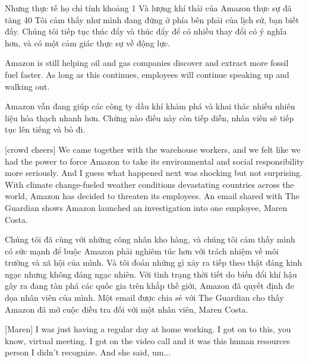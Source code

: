 \documentclass[a4paper]{article}
\begin{document}
	\begin{vietnamese-v2}
		Nhưng thực tế họ chỉ tính khoảng 1%
		Và lượng khí thải của Amazon thực sự đã tăng 40%
		Tôi cảm thấy như mình đang đứng ở phía bên phải của lịch sử, bạn biết đấy.
		Chúng tôi tiếp tục thúc đẩy và thúc đẩy để có nhiều thay đổi có ý nghĩa hơn, và có một cảm giác thực sự về động lực.
	\end{vietnamese-v2}
	
	Amazon is still helping oil and gas companies discover and extract more fossil fuel faster.
	As long as this continues, employees will continue speaking up and walking out.
	
	\begin{vietnamese-v2}
		Amazon vẫn đang giúp các công ty dầu khí khám phá và khai thác nhiều nhiên liệu hóa thạch nhanh hơn.
		Chừng nào điều này còn tiếp diễn, nhân viên sẽ tiếp tục lên tiếng và bỏ đi.
	\end{vietnamese-v2}
	
	[crowd cheers]
	We came together with the warehouse workers, and we felt like we had the power to force Amazon to take its environmental and social responsibility more seriously.
	And I guess what happened next was shocking but not surprising.
	With climate change-fueled weather conditions devastating countries across the world, Amazon has decided to threaten its employees.
    An email shared with The Guardian shows Amazon launched an investigation into one employee, Maren Costa.
	
	\begin{vietnamese-v2}
		Chúng tôi đã cùng với những công nhân kho hàng, và chúng tôi cảm thấy mình có sức mạnh để buộc Amazon phải nghiêm túc hơn với trách nhiệm về môi trường và xã hội của mình.
		Và tôi đoán những gì xảy ra tiếp theo thật đáng kinh ngạc nhưng không đáng ngạc nhiên.
		Với tình trạng thời tiết do biến đổi khí hậu gây ra đang tàn phá các quốc gia trên khắp thế giới, Amazon đã quyết định đe dọa nhân viên của mình.
		Một email được chia sẻ với The Guardian cho thấy Amazon đã mở cuộc điều tra đối với một nhân viên, Maren Costa.
	\end{vietnamese-v2}
	
	[Maren] I was just having a regular day at home working.
	I got on to this, you know, virtual meeting.
	I got on the video call and it was this human resources person
	I didn't recognize.
	And she said, um...
	
\end{document}
